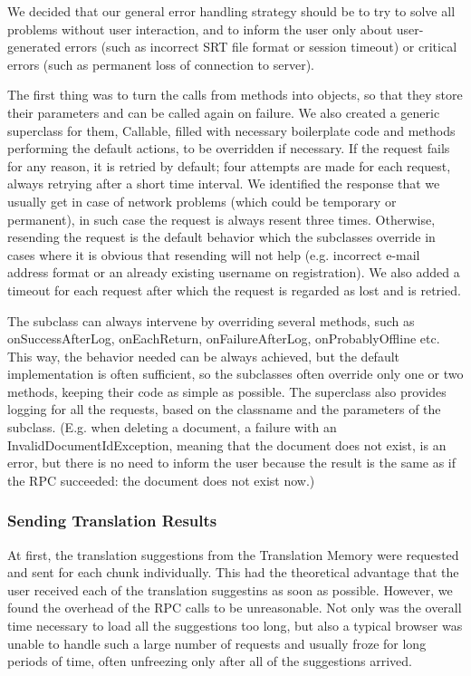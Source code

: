 We decided that our general error handling strategy should be to try to solve all problems without user interaction, and to inform the user only about user-generated errors (such as incorrect SRT file format or session timeout) or critical errors (such as permanent loss of connection to server).

The first thing was to turn the calls from methods into objects, so that they store their parameters and can be called again on failure. We also created a generic superclass for them, Callable, filled with necessary boilerplate code and methods performing the default actions, to be overridden if necessary. If the request fails for any reason, it is retried by default; four attempts are made for each request, always retrying after a short time interval. We identified the response that we usually get in case of network problems (which could be temporary or permanent), in such case the request is always resent three times. Otherwise, resending the request is the default behavior which the subclasses override in cases where it is obvious that resending will not help (e.g. incorrect e-mail address format or an already existing username on registration). We also added a timeout for each request after which the request is regarded as lost and is retried.

The subclass can always intervene by overriding several methods, such as onSuccessAfterLog, onEachReturn, onFailureAfterLog, onProbablyOffline etc. This way, the behavior needed can be always achieved, but the default implementation is often sufficient, so the subclasses often override only one or two methods, keeping their code as simple as possible. The superclass also provides logging for all the requests, based on the classname and the parameters of the subclass.
(E.g. when deleting a document, a failure with an InvalidDocumentIdException, meaning that the document does not exist, is an error, but there is no need to inform the user because the result is the same as if the RPC succeeded: the document does not exist now.)

\subsubsection{Sending Translation Results}

At first, the translation suggestions from the Translation Memory were requested and sent for each chunk individually. This had the theoretical advantage that the user received each of the translation suggestins as soon as possible. However, we found the overhead of the RPC calls to be unreasonable. Not only was the overall time necessary to load all the suggestions too long, but also a typical browser was unable to handle such a large number of requests and usually froze for long periods of time, often unfreezing only after all of the suggestions arrived.

